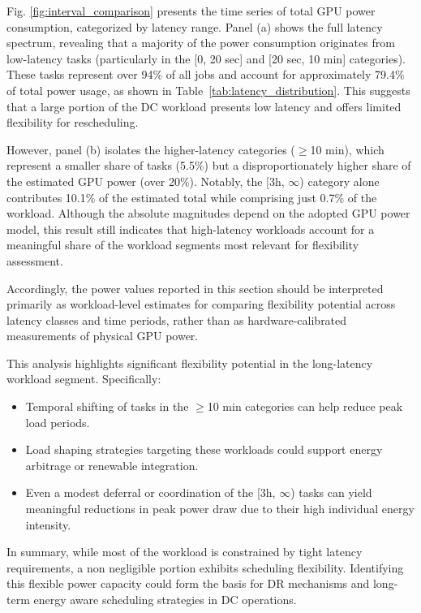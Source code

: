 \documentclass[preprint,12pt]{elsarticle}
\begin{document}
Fig. \ref{fig:interval_comparison} presents the time series of total GPU power consumption, categorized by latency range. Panel (a) shows the full latency spectrum, revealing that a majority of the power consumption originates from low-latency tasks (particularly in the [0, 20 sec] and [20 sec, 10 min] categories). These tasks represent over 94\% of all jobs and account for approximately 79.4\% of total power usage, as shown in Table~\ref{tab:latency_distribution}. This suggests that a large portion of the DC workload presents low latency and offers limited flexibility for rescheduling. 

However, panel (b) isolates the higher-latency categories ($\geq$10 min), which represent a smaller share of tasks (5.5\%) but a disproportionately higher share of the estimated GPU power (over 20\%). Notably, the [3h, $\infty$) category alone contributes 10.1\% of the estimated total while comprising just 0.7\% of the workload. Although the absolute magnitudes depend on the adopted GPU power model, this result still indicates that high-latency workloads account for a meaningful share of the workload segments most relevant for flexibility assessment.

Accordingly, the power values reported in this section should be interpreted primarily as workload-level estimates for comparing flexibility potential across latency classes and time periods, rather than as hardware-calibrated measurements of physical GPU power.

This analysis highlights significant flexibility potential in the long-latency workload segment. Specifically:
\begin{itemize}
    \item Temporal shifting of tasks in the $\geq$10 min categories can help reduce peak load periods.
    \item Load shaping strategies targeting these workloads could support energy arbitrage or renewable integration.
    \item Even a modest deferral or coordination of the [3h, $\infty$) tasks can yield meaningful reductions in peak power draw due to their high individual energy intensity.
\end{itemize}

In summary, while most of the workload is constrained by tight latency requirements, a non negligible portion exhibits scheduling flexibility. Identifying this flexible power capacity could form the basis for DR mechanisms and long-term energy aware scheduling strategies in DC operations.
\end{document}
